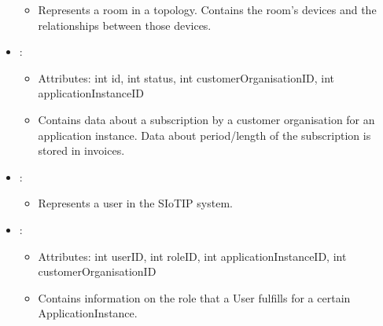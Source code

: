 \begin{itemize}[nolistsep,noitemsep]
\begin{itemize}[noitemsep,nolistsep]
\item[] Represents a room in a topology. Contains the room's devices and the relationships between those devices.
\end{itemize}
\item {}: 
\begin{itemize}[noitemsep,nolistsep]
\item[] Attributes: int id, int status, int customerOrganisationID, int applicationInstanceID
\item[] Contains data about a subscription by a customer organisation for an application instance. Data about period/length of the subscription is stored in invoices.
\end{itemize}
\item {}: 
\begin{itemize}[noitemsep,nolistsep]

\item[] Represents a user in the SIoTIP system.
\end{itemize}
\item {}: 
\begin{itemize}[noitemsep,nolistsep]
\item[] Attributes: int userID, int roleID, int applicationInstanceID, int customerOrganisationID
\item[] Contains information on the role that a User fulfills for a certain ApplicationInstance.
\end{itemize}
\end{itemize}

%